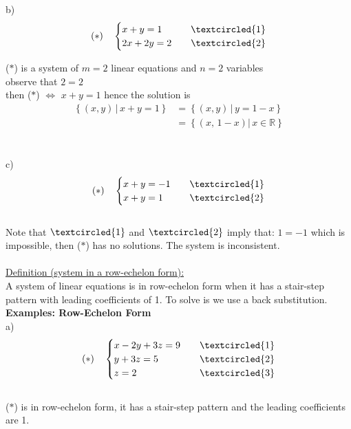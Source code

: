 \documentclass{jhwhw}
\begin{document}
b)  \begin{align*} 
    (\ast) \quad \begin{cases} 
    x+y=1 & \quad \textcircled{1} \\ 2x+2y=2 & \quad \textcircled{2}  
\end{cases}
\end{align*}

(\(\ast\)) is a system of \(m=2\) linear equations and \(n=2\) variables \\
observe that \(2=2\) \\
then (\(\ast\)) \(\Leftrightarrow\) \(x+y=1\) hence the solution is
\begin{align*} 
\left\{(x,y) \,|\, x+y=1 \right\} &= \left\{ (x,y) \, | \, y=1-x \right\} \\
&= \left\{(x, \, 1-x) | \, x \in \mathbb{R} \right\}
\end{align*}
\\ \\
c) \begin{align*} 
(\ast) \quad \begin{cases} x+y=-1 & \quad \textcircled{1} \\ x+y=1 & \quad \textcircled{2} \end{cases}
\end{align*}
\\
Note that \(\textcircled{1}\) and \(\textcircled{2}\) imply that: \(1=-1\) which is impossible, then (\(\ast\)) has no solutions. The system is inconsistent.
\\ \\

\underline{Definition (system in a row-echelon form):}
\\ 

A system of linear equations is in row-echelon form when it has a stair-step pattern with leading coefficients of 1. To solve is we use a back substitution.
\\

\textbf{Examples: Row-Echelon Form}
\\

a) \begin{align*} 
(\ast) \quad \begin{cases} x-2y+3z = 9 & \quad \textcircled{1} \\ y+3z=5 & \quad \textcircled{2} \\ z=2 & \quad \textcircled{3} \end{cases}
\end{align*}
\\
(\(\ast\)) is in row-echelon form, it has a stair-step pattern and the leading coefficients are 1.
\\ \\
\end{document}
